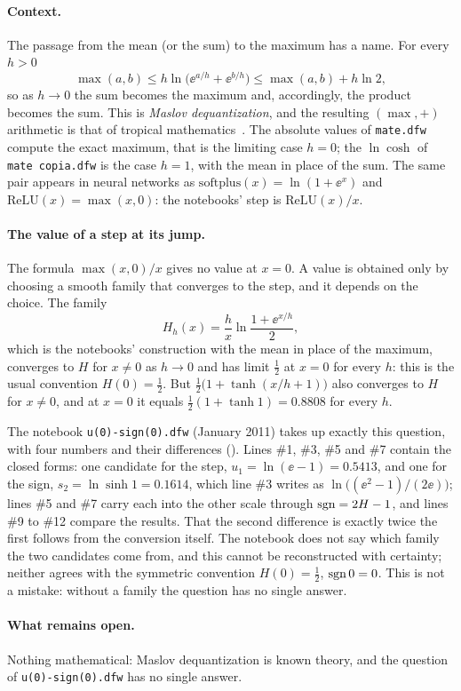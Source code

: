 \paragraph{Context.}
The passage from the mean (or the sum) to the maximum has a name. For every
$h>0$
\[
  \max(a,b)\le h\ln\bigl(\ee^{a/h}+\ee^{b/h}\bigr)\le\max(a,b)+h\ln2 ,
\]
so as $h\to0$ the sum becomes the maximum and, accordingly, the product
becomes the sum. This is \emph{Maslov dequantization}, and the resulting
$(\max,+)$ arithmetic is that of tropical mathematics~\cite{litvinov2007}.
The absolute values of \texttt{mate.dfw} compute the exact maximum, that is
the limiting case $h=0$; the $\ln\cosh$ of \texttt{mate copia.dfw} is the case
$h=1$, with the mean in place of the sum. The same pair appears in neural
networks as $\mathrm{softplus}(x)=\ln(1+\ee^{x})$ and
$\mathrm{ReLU}(x)=\max(x,0)$: the notebooks' step is $\mathrm{ReLU}(x)/x$.

\paragraph{The value of a step at its jump.}
The formula $\max(x,0)/x$ gives no value at $x=0$. A value is obtained only
by choosing a smooth family that converges to the step, and it depends on
the choice. The family
\[
  H_h(x)=\frac{h}{x}\ln\frac{1+\ee^{x/h}}{2},
\]
which is the notebooks' construction with the mean in place of the maximum,
converges to $H$ for $x\neq0$ as $h\to0$ and has limit $\tfrac12$ at $x=0$
for every $h$: this is the usual convention $H(0)=\tfrac12$. But
$\frac12\bigl(1+\tanh(x/h+1)\bigr)$ also converges to $H$ for $x\neq0$, and
at $x=0$ it equals $\frac12(1+\tanh1)=0.8808$ for every $h$.

The notebook \texttt{u(0)-sign(0).dfw} (January 2011) takes up exactly this
question, with four numbers and their differences
(). Lines \#1, \#3, \#5 and \#7 contain the
closed forms: one candidate for the step, $u_1=\ln(\ee-1)=0.5413$, and one for
the sign, $s_2=\ln\sinh1=0.1614$, which line \#3 writes as
$\ln\bigl((\ee^2-1)/(2\ee)\bigr)$; lines \#5 and \#7 carry each into the
other scale through $\operatorname{sgn}=2H-1$, and lines \#9 to \#12 compare the results.
That the second difference is exactly twice the first follows from the
conversion itself. The notebook does not say which family the two
candidates come from, and this cannot be reconstructed with certainty;
neither agrees with the symmetric convention $H(0)=\tfrac12$, $\operatorname{sgn}0=0$.
This is not a mistake: without a family the question has no single answer.

\paragraph{What remains open.}
Nothing mathematical: Maslov dequantization is known theory, and the question
of \texttt{u(0)-sign(0).dfw} has no single answer.
